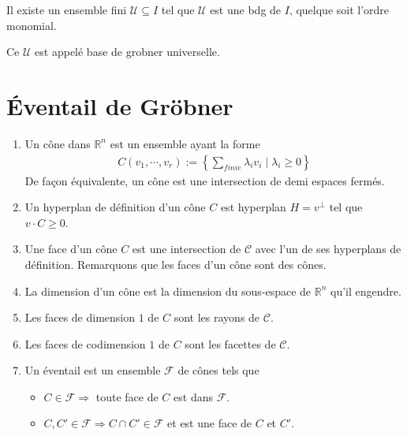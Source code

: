         \begin{coro}
            Il existe un ensemble fini $\mathcal{U} \subseteq I$ tel que $\mathcal{U}$ est une bdg de $I$, quelque soit l'ordre monomial.
        \end{coro}
        \begin{defi}
            Ce $\mathcal{U}$ est appelé base de grobner universelle.
        \end{defi}

    \section{Éventail de Gröbner}
        \begin{defi}
            \begin{enumerate}
                \item Un cône dans $\mathbb{R}^n$ est un ensemble ayant la forme
                \begin{align*}
                    C(v_1, \cdots, v_r) := \left\{ \sum_{finie} \lambda_i v_i \mid \lambda_i \geq 0 \right\}
                \end{align*}
                De façon équivalente, un cône est une intersection de demi espaces fermés.
                \item Un hyperplan de définition d'un cône $C$ est hyperplan $H = v^\bot$ tel que $v \cdot C \geq 0$.
                \item Une face d'un cône $C$ est une intersection de $\mathcal{C}$ avec l'un de ses hyperplans de définition. Remarquons que les faces d'un cône sont des cônes.
                \item La dimension d'un cône est la dimension du sous-espace de $\mathbb{R}^n$ qu'il engendre.
                \item Les faces de dimension $1$ de $C$ sont les rayons de $\mathcal{C}$.
                \item Les faces de codimension $1$ de $C$ sont les facettes de $\mathcal{C}$.
                \item Un éventail est un ensemble $\mathcal{F}$ de cônes tels que
                \begin{itemize}
                    \item $C \in \mathcal{F} \Rightarrow$ toute face de $C$ est dans $\mathcal{F}$.
                    \item $C,C' \in \mathcal{F} \Rightarrow C \cap C' \in \mathcal{F}$ et est une face de $C$ et $C'$.
                \end{itemize}
            \end{enumerate}
        \end{defi}

